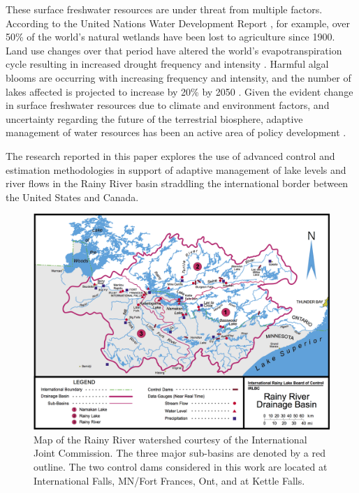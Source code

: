 \documentclass[preprint,times]{elsarticle}
\begin{document}
These surface freshwater resources are under threat from multiple factors. According to the United Nations Water Development Report \cite{wwap2003united,Verhoeven:2010aa}, for example, over 50\% of the world's natural wetlands have been lost to agriculture since 1900. Land use changes over that period have altered the world's evapotranspiration cycle resulting in increased drought frequency and intensity \cite{Fisher2017}. Harmful algal blooms are occurring with increasing frequency and intensity, and the number of lakes affected is projected to increase by 20\% by 2050 \cite{wwap2015united}. Given the evident change in surface freshwater resources due to climate and environment factors, and uncertainty regarding the future of the terrestrial biosphere, adaptive management of water resources has been an active area of policy development \cite{williams2011adaptive,pahl2007transitions,loucks2005water,board2004adaptive}.

The research reported in this paper explores the use of advanced control and estimation methodologies in support of adaptive management of lake levels and river flows in the Rainy River basin straddling the international border between the United States and Canada.

\begin{figure}
\includegraphics[width=\linewidth]{rl_basinmap.png}
\caption{Map of the Rainy River watershed courtesy of the International Joint Commission. The three major sub-basins are denoted by a red outline. The two control dams considered in this work are located at International Falls, MN/Fort Frances, Ont, and at Kettle Falls. }\label{figure:2}
\end{figure}
 
\end{document}
